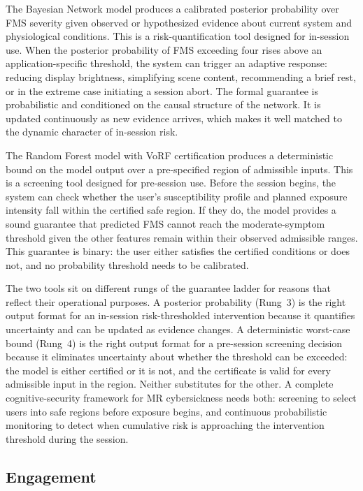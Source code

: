 \documentclass[graybox]{svmult}
\begin{document}
The Bayesian Network model produces a calibrated posterior probability over FMS severity given observed or hypothesized evidence about current system and physiological conditions. This is a risk-quantification tool designed for in-session use. When the posterior probability of FMS exceeding four rises above an application-specific threshold, the system can trigger an adaptive response: reducing display brightness, simplifying scene content, recommending a brief rest, or in the extreme case initiating a session abort. The formal guarantee is probabilistic and conditioned on the causal structure of the network. It is updated continuously as new evidence arrives, which makes it well matched to the dynamic character of in-session risk.

The Random Forest model with VoRF certification produces a deterministic bound on the model output over a pre-specified region of admissible inputs. This is a screening tool designed for pre-session use. Before the session begins, the system can check whether the user's susceptibility profile and planned exposure intensity fall within the certified safe region. If they do, the model provides a sound guarantee that predicted FMS cannot reach the moderate-symptom threshold given the other features remain within their observed admissible ranges. This guarantee is binary: the user either satisfies the certified conditions or does not, and no probability threshold needs to be calibrated.

The two tools sit on different rungs of the guarantee ladder for reasons that reflect their operational purposes. A posterior probability (Rung~3) is the right output format for an in-session risk-thresholded intervention because it quantifies uncertainty and can be updated as evidence changes. A deterministic worst-case bound (Rung~4) is the right output format for a pre-session screening decision because it eliminates uncertainty about whether the threshold can be exceeded: the model is either certified or it is not, and the certificate is valid for every admissible input in the region. Neither substitutes for the other. A complete cognitive-security framework for MR cybersickness needs both: screening to select users into safe regions before exposure begins, and continuous probabilistic monitoring to detect when cumulative risk is approaching the intervention threshold during the session.

\subsection{Engagement}
\label{sec:engagement}
\end{document}
